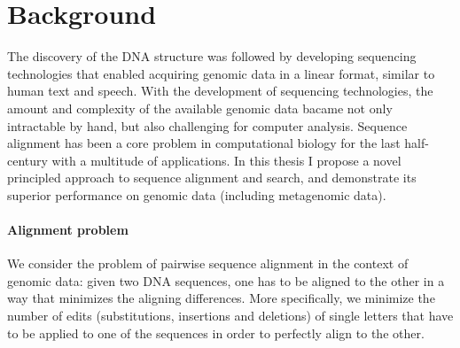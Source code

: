\section*{Background}

The discovery of the DNA structure\citep{watson1953structure} was followed by
developing sequencing technologies that enabled acquiring genomic data in a
linear format, similar to human text and speech. With the development of
sequencing technologies, the amount and complexity of the available genomic data
bacame not only intractable by hand, but also challenging for computer analysis.
Sequence alignment has been a core problem in computational biology for the last
half-century with a multitude of applications. In this thesis I propose a novel
principled approach to sequence alignment and search, and demonstrate its
superior performance on genomic data (including metagenomic data).

\paragraph{Alignment problem}
We consider the problem of pairwise sequence alignment in the context of genomic
data: given two DNA sequences, one has to be aligned to the other in a way that
minimizes the aligning differences. More specifically, we minimize the number of
edits (substitutions, insertions and deletions) of single letters that have to
be applied to one of the sequences in order to perfectly align to the other.

